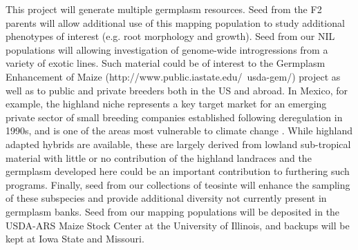 This project will generate multiple germplasm resources.  Seed from the F2 parents will allow additional use of this mapping population to study additional phenotypes of interest (e.g. root morphology and growth).  Seed from our NIL populations will allowing investigation of genome-wide introgressions from a variety of exotic lines.  Such material could be of interest to the Germplasm Enhancement of Maize (http://www.public.iastate.edu/~usda-gem/) project as well as to public and private breeders both in the US and abroad. In Mexico, for example, the highland niche represents a key target market for an emerging private sector of small breeding companies established following deregulation in 1990s, and is one of the areas most vulnerable to climate change \citep{Bellon2011}. While highland adapted hybrids are available, these are largely derived from lowland sub-tropical material with little or no contribution of the highland landraces and the germplasm developed here could be an important contribution to furthering such programs. Finally, seed from our collections of teosinte will enhance the sampling of these subspecies and provide additional diversity not currently present in germplasm banks.  Seed from our mapping populations will be deposited in the USDA-ARS Maize Stock Center at the University of Illinois, and backups will be kept at Iowa State and Missouri.




